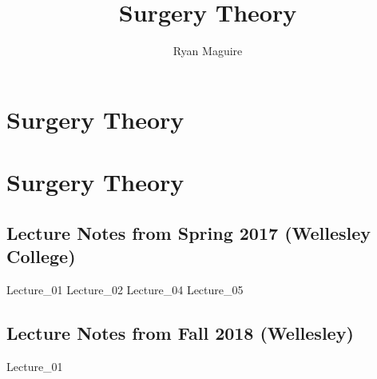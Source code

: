 \documentclass[crop=false,class=book,oneside]{standalone}
\begin{document}
    \newif\ifsurgery
    \ifx\ifmath\undefined
        \title{Surgery Theory}
        \author{Ryan Maguire}
        \date{\vspace{-5ex}}
        \maketitle
        \tableofcontents
        \listoffigures
        \clearpage
        \chapter*{Surgery Theory}
        \setcounter{chapter}{1}
    \else
        \chapter{Surgery Theory}
    \fi
    \section{Lecture Notes from Spring 2017 (Wellesley College)}
        {Lecture_01}
        {Lecture_02}
        {Lecture_04}
        {Lecture_05}
    \section{Lecture Notes from Fall 2018 (Wellesley)}
        {Lecture_01}
        
\end{document}

